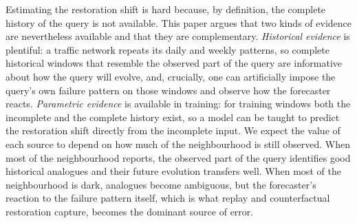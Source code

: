 Estimating the restoration shift is hard because, by definition, the complete history of the query is not available. This paper argues that two kinds of evidence are nevertheless available and that they are complementary.
\emph{Historical evidence} is plentiful: a traffic network repeats its daily and weekly patterns, so complete historical windows that resemble the observed part of the query are informative about how the query will evolve, and, crucially, one can artificially impose the query's own failure pattern on those windows and observe how the forecaster reacts.
\emph{Parametric evidence} is available in training: for training windows both the incomplete and the complete history exist, so a model can be taught to predict the restoration shift directly from the incomplete input.
We expect the value of each source to depend on how much of the neighbourhood is still observed. When most of the neighbourhood reports, the observed part of the query identifies good historical analogues and their future evolution transfers well. When most of the neighbourhood is dark, analogues become ambiguous, but the forecaster's reaction to the failure pattern itself, which is what replay and counterfactual restoration capture, becomes the dominant source of error.

